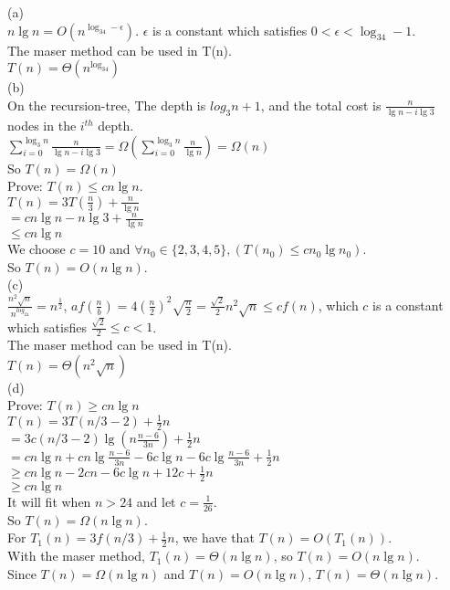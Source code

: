 \documentclass[a4paper, justified]{tufte-handout}
\begin{document}
\begin{solution}
  \noindent(a)\\
  $n\lg n=O(n^{\log_34-\epsilon})$. $\epsilon$ is a constant which satisfies $0<\epsilon<\log_34-1$.\\
  The maser method can be used in T(n).\\
  $T(n)=\Theta(n^{\log_34})$\\

  \noindent(b)\\
  On the  recursion-tree, The depth is  $log_3{n}+1$, and the total cost is  $\frac{n}{\lg n-i\lg 3}$ nodes in the $i^{th}$ depth.\\
  $\sum\limits_{i=0}^{\log_3n} \frac{n}{\lg n-i\lg 3}=\Omega(\sum\limits_{i=0}^{\log_3n} \frac{n}{\lg n})=\Omega(n)$\\
  So $T(n)=\Omega(n)$\\
  Prove: $T(n)\leq cn\lg n$.\\
  $T(n)=3T(\frac{n}{3})+\frac{n}{\lg n}$\\
  \hspace*{2.5em}$=cn\lg n-n\lg 3+\frac{n}{\lg n}$\\
  \hspace*{2.5em}$\leq cn\lg n$\\
  We choose $c=10$ and $\forall n_0\in\{2,3,4,5\},(T(n_0)\leq cn_0\lg n_0)$.\\
  So $T(n)=O(n\lg n)$.\\

  \noindent(c)\\
  $\frac{n^2\sqrt{n}}{n^{log_24}}=n^{\frac{1}{2}}$, $af(\frac{n}{b})=4(\frac{n}{2})^2\sqrt{\frac{n}{2}}=\frac{\sqrt{2}}{2}n^2\sqrt{n}\leq cf(n)$, which $c$ is a constant which satisfies $\frac{\sqrt{2}}{2}\leq c<1$.\\
  The maser method can be used in T(n).\\
  $T(n)=\Theta(n^2\sqrt{n})$\\

  \noindent(d)\\
  Prove: $T(n)\geq cn\lg n$\\
  $T(n)=3 T(n / 3-2)+\frac{1}{2}n$\\
  \hspace*{2.5em}$=3c(n/3-2)\lg(n\frac{n-6}{3n})+\frac{1}{2}n$\\
  \hspace*{2.5em}$=cn\lg n+ cn \lg\frac{n-6}{3n}-6c\lg n-6c\lg\frac{n-6}{3n}+\frac{1}{2}n$\\
  \hspace*{2.5em}$\geq cn\lg n-2cn-6c\lg n+12c+\frac{1}{2}n$\\
  \hspace*{2.5em}$\geq cn\lg n$\\
  It will fit when $n>24$ and let $c=\frac{1}{26}$.\\
  So $T(n)=\Omega(n\lg n)$.\\
  For $T_1(n)=3f(n/3)+\frac{1}{2}n$, we have that $T(n)=O(T_1(n))$.\\
  With the maser method, $T_1(n)=\Theta(n\lg n)$, so $T(n)=O(n\lg n)$.\\
  Since $T(n)=\Omega(n\lg n)$ and $T(n)=O(n\lg n)$, $T(n)=\Theta(n\lg n)$.\\


\end{solution}
\end{document}

